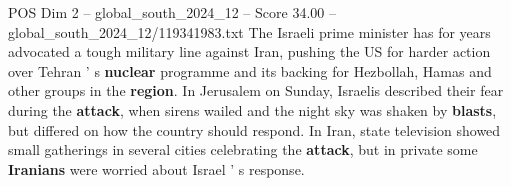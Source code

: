 \begin{textsample}{POS Dim 2 – global\_south\_2024\_12 – Score 34.00 – global\_south\_2024\_12/119341983.txt}
The Israeli prime minister has for years advocated a tough military line against Iran, pushing the US for harder action over Tehran ' s \textbf{nuclear} programme and its backing for Hezbollah, Hamas and other groups in the \textbf{region}.
In Jerusalem on Sunday, Israelis described their fear during the \textbf{attack}, when sirens wailed and the night sky was shaken by \textbf{blasts}, but differed on how the country should respond.
In Iran, state television showed small gatherings in several cities celebrating the \textbf{attack}, but in private some \textbf{Iranians} were worried about Israel ' s response.

\end{textsample}

